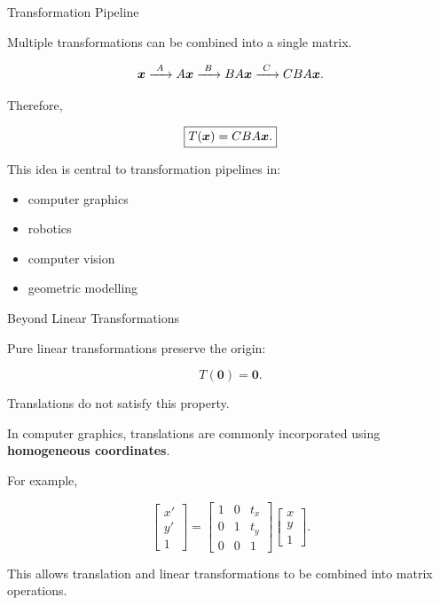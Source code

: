
\begin{frame}{Transformation Pipeline}

Multiple transformations can be combined into a single matrix.

\[
\bm{x}
\xrightarrow{\ A\ }
A\bm{x}
\xrightarrow{\ B\ }
BA\bm{x}
\xrightarrow{\ C\ }
CBA\bm{x}.
\]

Therefore,

\[
\boxed{
T(\bm{x})=CBA\bm{x}.
}
\]

\vspace{0.5cm}

This idea is central to transformation pipelines in:

\begin{itemize}
    \item computer graphics
    \item robotics
    \item computer vision
    \item geometric modelling
\end{itemize}

\end{frame}



\begin{frame}{Beyond Linear Transformations}

Pure linear transformations preserve the origin:

\[
\boxed{
T(\mathbf{0})=\mathbf{0}.
}
\]

Translations do not satisfy this property.

\vspace{0.4cm}

In computer graphics, translations are commonly incorporated
using \textbf{homogeneous coordinates}.

For example,

\[
\begin{bmatrix}
x'\\
y'\\
1
\end{bmatrix}
=
\begin{bmatrix}
1&0&t_x\\
0&1&t_y\\
0&0&1
\end{bmatrix}
\begin{bmatrix}
x\\
y\\
1
\end{bmatrix}.
\]

This allows translation and linear transformations to be
combined into matrix operations.

\end{frame}
